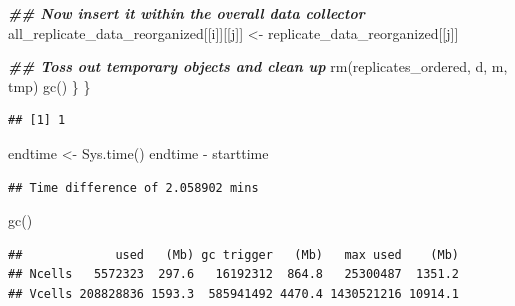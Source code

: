 \documentclass[
]{book}
\newenvironment{Shaded}{\begin{snugshade}}{\end{snugshade}}
\newcommand{\CommentTok}[1]{\textcolor[rgb]{0.56,0.35,0.01}{\textit{#1}}}
\newcommand{\ControlFlowTok}[1]{\textcolor[rgb]{0.13,0.29,0.53}{\textbf{#1}}}
\newcommand{\DecValTok}[1]{\textcolor[rgb]{0.00,0.00,0.81}{#1}}
\newcommand{\DocumentationTok}[1]{\textcolor[rgb]{0.56,0.35,0.01}{\textbf{\textit{#1}}}}
\newcommand{\FunctionTok}[1]{\textcolor[rgb]{0.00,0.00,0.00}{#1}}
\newcommand{\NormalTok}[1]{#1}
\newcommand{\OtherTok}[1]{\textcolor[rgb]{0.56,0.35,0.01}{#1}}
\newcommand{\SpecialCharTok}[1]{\textcolor[rgb]{0.00,0.00,0.00}{#1}}
\begin{document}
\begin{Shaded}
\begin{Highlighting}[]
    \DocumentationTok{\#\# Now insert it within the overall data collector}
\NormalTok{    all\_replicate\_data\_reorganized[[i]][[j]] }\OtherTok{\textless{}{-}}
\NormalTok{      replicate\_data\_reorganized[[j]]}

    \DocumentationTok{\#\# Toss out temporary objects and clean up}
    \FunctionTok{rm}\NormalTok{(replicates\_ordered, d, m, tmp)}
    \FunctionTok{gc}\NormalTok{()}
\NormalTok{  \}}
\NormalTok{\}}
\end{Highlighting}
\end{Shaded}

\begin{verbatim}
## [1] 1
\end{verbatim}

\begin{Shaded}
\begin{Highlighting}[]
\NormalTok{endtime }\OtherTok{\textless{}{-}} \FunctionTok{Sys.time}\NormalTok{()}
\NormalTok{endtime }\SpecialCharTok{{-}}\NormalTok{ starttime}
\end{Highlighting}
\end{Shaded}

\begin{verbatim}
## Time difference of 2.058902 mins
\end{verbatim}

\begin{Shaded}
\begin{Highlighting}[]
\FunctionTok{gc}\NormalTok{()}
\end{Highlighting}
\end{Shaded}

\begin{verbatim}
##             used   (Mb) gc trigger   (Mb)   max used    (Mb)
## Ncells   5572323  297.6   16192312  864.8   25300487  1351.2
## Vcells 208828836 1593.3  585941492 4470.4 1430521216 10914.1
\end{verbatim}

\begin{Shaded}
\end{Shaded}
\end{document}
